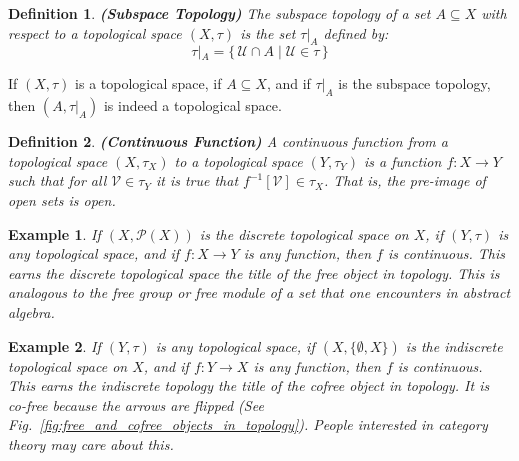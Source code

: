 \documentclass{article}
\theoremstyle{plain}
\theoremstyle{normal}
\newtheorem{definition}{Definition}[section]
\newtheorem{example}{Example}[section]
\begin{document}
        \begin{definition}{\textbf{(Subspace Topology)}}
            The subspace topology of a set $A\subseteq{X}$ with respect to a
            topological space $(X,\tau)$ is the set $\tau|_{A}$ defined by:
            \begin{equation}
                \tau|_{A}=\{\,\mathcal{U}\cap{A}\;|\;\mathcal{U}\in\tau\,\}
            \end{equation}
        \end{definition}
        If $(X,\tau)$ is a topological space, if $A\subseteq{X}$, and if
        $\tau|_{A}$ is the subspace topology, then $(A,\tau|_{A})$ is indeed
        a topological space.
        \begin{definition}{\textbf{(Continuous Function)}}
            A continuous function from a topological space $(X,\tau_{X})$ to
            a topological space $(Y,\tau_{Y})$ is a function $f:X\rightarrow{Y}$
            such that for all $\mathcal{V}\in\tau_{Y}$ it is true that
            $f^{-1}[\mathcal{V}]\in\tau_{X}$. That is, the pre-image of open
            sets is open.
        \end{definition}
        \begin{example}
            If $(X,\mathcal{P}(X))$ is the discrete topological space on $X$,
            if $(Y,\tau)$ is any topological space, and if $f:X\rightarrow{Y}$
            is any function, then $f$ is continuous. This earns the discrete
            topological space the title of the \textit{free object} in topology.
            This is analogous to the \textit{free group} or \textit{free module}
            of a set that one encounters in abstract algebra.
        \end{example}
        \begin{example}
            If $(Y,\tau)$ is any topological space, if $(X,\{\emptyset,X\})$ is
            the indiscrete topological space on $X$, and if $f:Y\rightarrow{X}$
            is any function, then $f$ is continuous. This earns the indiscrete
            topology the title of the \textit{cofree object} in topology. It is
            \textit{co-free} because the arrows are flipped (See
            Fig.~\ref{fig:free_and_cofree_objects_in_topology}).
            People interested in category theory may care about this.
        \end{example}
\end{document}
